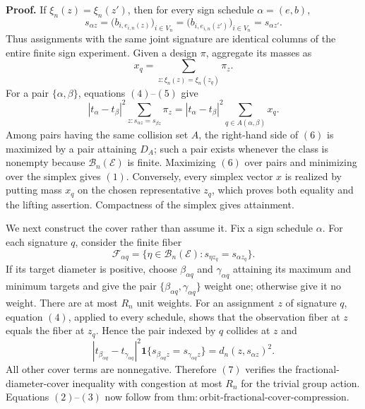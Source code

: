 \textbf{Proof.}
If \(\xi_n(z)=\xi_n(z')\), then for every sign schedule \(\alpha=(e,b)\),
\[
 s_{\alpha z}
 =\bigl(b_{i,e_{i,n}(z)}\bigr)_{i\in V_n}
 =\bigl(b_{i,e_{i,n}(z')}\bigr)_{i\in V_n}
 =s_{\alpha z'}. \tag{4}
\]
Thus assignments with the same joint signature are identical columns of the entire finite sign experiment. Given a design \(\pi\), aggregate its masses as
\[
 x_q=\sum_{z:\xi_n(z)=\xi_n(z_q)}\pi_z. \tag{5}
\]
For a pair \(\{\alpha,\beta\}\), equations \((4)\)--\((5)\) give
\[
 |t_\alpha-t_\beta|^2
 \sum_{z:s_{\alpha z}=s_{\beta z}}\pi_z
 =|t_\alpha-t_\beta|^2
 \sum_{q\in A(\alpha,\beta)}x_q. \tag{6}
\]
Among pairs having the same collision set \(A\), the right-hand side of \((6)\) is maximized by a pair attaining \(D_A\); such a pair exists whenever the class is nonempty because \(\mathcal B_n(\mathcal E)\) is finite. Maximizing \((6)\) over pairs and minimizing over the simplex gives \((1)\). Conversely, every simplex vector \(x\) is realized by putting mass \(x_q\) on the chosen representative \(z_q\), which proves both equality and the lifting assertion. Compactness of the simplex gives attainment.

We next construct the cover rather than assume it. Fix a sign schedule \(\alpha\). For each signature \(q\), consider the finite fiber
\[
 \mathcal F_{\alpha q}
 =\{\eta\in\mathcal B_n(\mathcal E):s_{\eta z_q}=s_{\alpha z_q}\}.
\]
If its target diameter is positive, choose \(\beta_{\alpha q}\) and \(\gamma_{\alpha q}\) attaining its maximum and minimum targets and give the pair \(\{\beta_{\alpha q},\gamma_{\alpha q}\}\) weight one; otherwise give it no weight. There are at most \(R_n\) unit weights. For an assignment \(z\) of signature \(q\), equation \((4)\), applied to every schedule, shows that the observation fiber at \(z\) equals the fiber at \(z_q\). Hence the pair indexed by \(q\) collides at \(z\) and
\[
 |t_{\beta_{\alpha q}}-t_{\gamma_{\alpha q}}|^2
 \mathbf 1\{s_{\beta_{\alpha q}z}=s_{\gamma_{\alpha q}z}\}
 =d_n(z,s_{\alpha z})^2. \tag{7}
\]
All other cover terms are nonnegative. Therefore \((7)\) verifies the fractional-diameter-cover inequality with congestion at most \(R_n\) for the trivial group action. Equations \((2)\)--\((3)\) now follow from \(\mathrm{thm{:}orbit\text{-}fractional\text{-}cover\text{-}compression}\).

